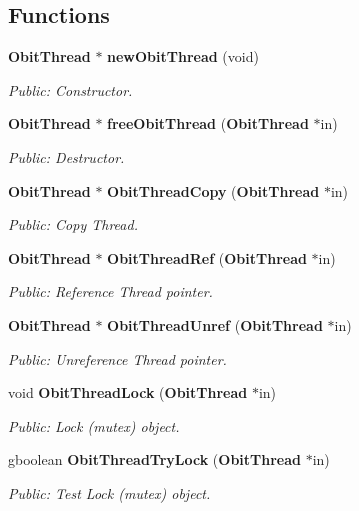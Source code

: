 \subsection*{Functions}
\begin{CompactItemize}
\item 
{\bf Obit\-Thread} $\ast$ {\bf new\-Obit\-Thread} (void)
\begin{CompactList}\small\item\em Public: Constructor. \item\end{CompactList}\item 
{\bf Obit\-Thread} $\ast$ {\bf free\-Obit\-Thread} ({\bf Obit\-Thread} $\ast$in)
\begin{CompactList}\small\item\em Public: Destructor. \item\end{CompactList}\item 
{\bf Obit\-Thread} $\ast$ {\bf Obit\-Thread\-Copy} ({\bf Obit\-Thread} $\ast$in)
\begin{CompactList}\small\item\em Public: Copy Thread. \item\end{CompactList}\item 
{\bf Obit\-Thread} $\ast$ {\bf Obit\-Thread\-Ref} ({\bf Obit\-Thread} $\ast$in)
\begin{CompactList}\small\item\em Public: Reference Thread pointer. \item\end{CompactList}\item 
{\bf Obit\-Thread} $\ast$ {\bf Obit\-Thread\-Unref} ({\bf Obit\-Thread} $\ast$in)
\begin{CompactList}\small\item\em Public: Unreference Thread pointer. \item\end{CompactList}\item 
void {\bf Obit\-Thread\-Lock} ({\bf Obit\-Thread} $\ast$in)
\begin{CompactList}\small\item\em Public: Lock (mutex) object. \item\end{CompactList}\item 
gboolean {\bf Obit\-Thread\-Try\-Lock} ({\bf Obit\-Thread} $\ast$in)
\begin{CompactList}\small\item\em Public: Test Lock (mutex) object. \item\end{CompactList}\item 

\end{CompactItemize}
